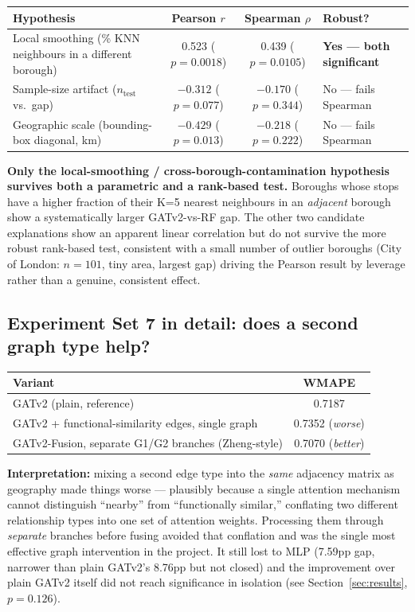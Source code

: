\documentclass[11pt]{article}
\let\oldsubsection\subsection
\renewcommand{\subsection}[1]{\oldsubsection{\color{sectcolor}#1}}
\begin{document}
\begin{center}
\small
\begin{tabular}{@{}lccl@{}}
\toprule
\textbf{Hypothesis} & \textbf{Pearson $r$} & \textbf{Spearman $\rho$} & \textbf{Robust?} \\
\midrule
Local smoothing (\% KNN neighbours in a different borough) & 0.523 ($p{=}0.0018$) & 0.439 ($p{=}0.0105$) & \textbf{Yes --- both significant} \\
Sample-size artifact ($n_{\mathrm{test}}$ vs.\ gap) & $-0.312$ ($p{=}0.077$) & $-0.170$ ($p{=}0.344$) & No --- fails Spearman \\
Geographic scale (bounding-box diagonal, km) & $-0.429$ ($p{=}0.013$) & $-0.218$ ($p{=}0.222$) & No --- fails Spearman \\
\bottomrule
\end{tabular}
\end{center}
\textbf{Only the local-smoothing / cross-borough-contamination hypothesis survives both a
parametric and a rank-based test.} Boroughs whose stops have a higher fraction of their K=5
nearest neighbours in an \emph{adjacent} borough show a systematically larger GATv2-vs-RF
gap. The other two candidate explanations show an apparent linear correlation but do not
survive the more robust rank-based test, consistent with a small number of outlier boroughs
(City of London: $n{=}101$, tiny area, largest gap) driving the Pearson result by leverage
rather than a genuine, consistent effect.

\newpage
\subsection{Experiment Set 7 in detail: does a second graph type help?}
\label{sec:expset7}
\begin{center}
\small
\begin{tabular}{@{}lc@{}}
\toprule
\textbf{Variant} & \textbf{WMAPE} \\
\midrule
GATv2 (plain, reference) & 0.7187 \\
GATv2 + functional-similarity edges, single graph & 0.7352 (\emph{worse}) \\
GATv2-Fusion, separate G1/G2 branches (Zheng-style) & 0.7070 (\emph{better}) \\
\bottomrule
\end{tabular}
\end{center}
\textbf{Interpretation:} mixing a second edge type into the \emph{same} adjacency matrix as
geography made things worse --- plausibly because a single attention mechanism cannot
distinguish ``nearby'' from ``functionally similar,'' conflating two different relationship
types into one set of attention weights. Processing them through \emph{separate} branches
before fusing avoided that conflation and was the single most effective graph intervention
in the project. It still lost to MLP (7.59pp gap, narrower than plain GATv2's 8.76pp but not
closed) and the improvement over plain GATv2 itself did not reach significance in isolation
(see Section~\ref{sec:results}, $p=0.126$).
\end{document}
